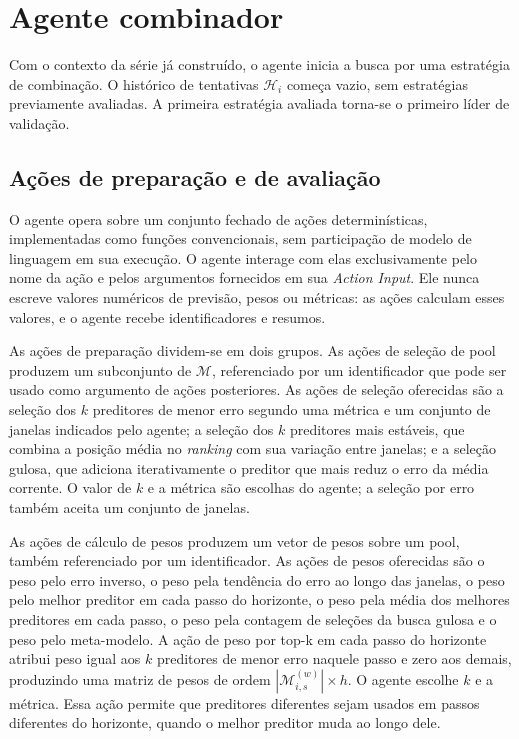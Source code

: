 \section{Agente combinador} \label{sec:agente}

Com o contexto da série já construído, o agente inicia a busca por uma estratégia de combinação. O histórico de tentativas $\mathcal{H}_i$ começa vazio, sem estratégias previamente avaliadas. A primeira estratégia avaliada torna-se o primeiro líder de validação.

\subsection{Ações de preparação e de avaliação}

O agente opera sobre um conjunto fechado de ações determinísticas, implementadas como funções convencionais, sem participação de modelo de linguagem em sua execução. O agente interage com elas exclusivamente pelo nome da ação e pelos argumentos fornecidos em sua \textit{Action Input}. Ele nunca escreve valores numéricos de previsão, pesos ou métricas: as ações calculam esses valores, e o agente recebe identificadores e resumos.

As ações de preparação dividem-se em dois grupos. As ações de seleção de pool produzem um subconjunto de $\mathcal{M}$, referenciado por um identificador que pode ser usado como argumento de ações posteriores. As ações de seleção oferecidas são a seleção dos $k$ preditores de menor erro segundo uma métrica e um conjunto de janelas indicados pelo agente; a seleção dos $k$ preditores mais estáveis, que combina a posição média no \textit{ranking} com sua variação entre janelas; e a seleção gulosa, que adiciona iterativamente o preditor que mais reduz o erro da média corrente. O valor de $k$ e a métrica são escolhas do agente; a seleção por erro também aceita um conjunto de janelas.

As ações de cálculo de pesos produzem um vetor de pesos sobre um pool, também referenciado por um identificador. As ações de pesos oferecidas são o peso pelo erro inverso, o peso pela tendência do erro ao longo das janelas, o peso pelo melhor preditor em cada passo do horizonte, o peso pela média dos melhores preditores em cada passo, o peso pela contagem de seleções da busca gulosa e o peso pelo meta-modelo. A ação de peso por top-k em cada passo do horizonte atribui peso igual aos $k$ preditores de menor erro naquele passo e zero aos demais, produzindo uma matriz de pesos de ordem $|\mathcal{M}_{i,s}^{(w)}| \times h$. O agente escolhe $k$ e a métrica. Essa ação permite que preditores diferentes sejam usados em passos diferentes do horizonte, quando o melhor preditor muda ao longo dele.

